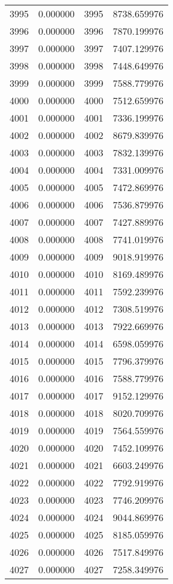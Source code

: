 \documentclass[12pt]{article}
\begin{document}
\begin{longtable}{@{}cccc@{}}
3995 & 0.000000 & 3995 & 8738.659976 \\
3996 & 0.000000 & 3996 & 7870.199976 \\
3997 & 0.000000 & 3997 & 7407.129976 \\
3998 & 0.000000 & 3998 & 7448.649976 \\
3999 & 0.000000 & 3999 & 7588.779976 \\
4000 & 0.000000 & 4000 & 7512.659976 \\
4001 & 0.000000 & 4001 & 7336.199976 \\
4002 & 0.000000 & 4002 & 8679.839976 \\
4003 & 0.000000 & 4003 & 7832.139976 \\
4004 & 0.000000 & 4004 & 7331.009976 \\
4005 & 0.000000 & 4005 & 7472.869976 \\
4006 & 0.000000 & 4006 & 7536.879976 \\
4007 & 0.000000 & 4007 & 7427.889976 \\
4008 & 0.000000 & 4008 & 7741.019976 \\
4009 & 0.000000 & 4009 & 9018.919976 \\
4010 & 0.000000 & 4010 & 8169.489976 \\
4011 & 0.000000 & 4011 & 7592.239976 \\
4012 & 0.000000 & 4012 & 7308.519976 \\
4013 & 0.000000 & 4013 & 7922.669976 \\
4014 & 0.000000 & 4014 & 6598.059976 \\
4015 & 0.000000 & 4015 & 7796.379976 \\
4016 & 0.000000 & 4016 & 7588.779976 \\
4017 & 0.000000 & 4017 & 9152.129976 \\
4018 & 0.000000 & 4018 & 8020.709976 \\
4019 & 0.000000 & 4019 & 7564.559976 \\
4020 & 0.000000 & 4020 & 7452.109976 \\
4021 & 0.000000 & 4021 & 6603.249976 \\
4022 & 0.000000 & 4022 & 7792.919976 \\
4023 & 0.000000 & 4023 & 7746.209976 \\
4024 & 0.000000 & 4024 & 9044.869976 \\
4025 & 0.000000 & 4025 & 8185.059976 \\
4026 & 0.000000 & 4026 & 7517.849976 \\
4027 & 0.000000 & 4027 & 7258.349976 \\

\end{longtable}
\end{document}
